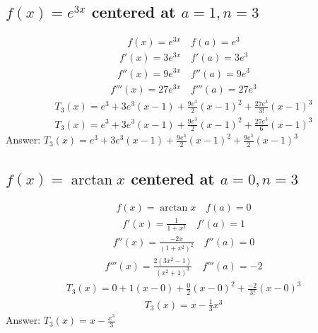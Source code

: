 \documentclass{article}
\begin{document}
\subsection{$f(x) = e^{3x}$ centered at $a = 1, n = 3$}
\begin{align*}
	f(x) = e^{3x} \quad f(a) = e^3
\end{align*}
\begin{align*}
	f'(x) = 3e^{3x} \quad f'(a) = 3e^3
\end{align*}
\begin{align*}
	f''(x) = 9e^{3x} \quad f''(a) = 9e^3
\end{align*}
\begin{align*}
	f'''(x) = 27e^{3x} \quad f'''(a) = 27e^3
\end{align*}
\begin{align*}
	T_3(x) = e^3 + 3e^3(x - 1) + \frac{9e^3}{2}(x - 1)^2 + \frac{27e^3}{3!}(x - 1)^3
\end{align*}
\begin{align*}
	T_3 (x) = e^3 + 3e^3 (x - 1) + \frac{9e^3}{2} (x - 1)^2 + \frac{27e^3}{6} (x - 1)^3
\end{align*}
Answer: $T_3 (x) = e^3 + 3e^3 (x - 1) + \frac{9e^3}{2} (x - 1)^2 + \frac{9e^3}{2} (x - 1)^3$

\subsection{$f(x) = \arctan{x}$ centered at $a = 0, n = 3$}
\begin{align*}
	f(x) = \arctan{x} \quad f(a) = 0
\end{align*}
\begin{align*}
	f'(x) = \frac{1}{1 + x^2} \quad f'(a) = 1
\end{align*}
\begin{align*}
	f''(x) = \frac{-2x}{(1 + x^2)^2} \quad f''(a) = 0
\end{align*}
\begin{align*}
	f'''(x) = \frac{2(3x^2 - 1)}{(x^2 + 1)^3} \quad f'''(a) = -2
\end{align*}
\begin{align*}
	T_3(x) = 0 + 1(x - 0) + \frac{0}{2}(x - 0)^2 + \frac{-2}{3!}(x - 0)^3
\end{align*}
\begin{align*}
	T_3(x) = x - \frac{1}{3}x^3
\end{align*}
Answer: $T_3 (x) = x - \frac{x^3}{3}$

\end{document}
